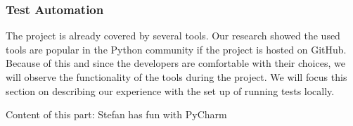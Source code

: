 \subsubsection{Test Automation}
The project is already covered by several tools. Our research showed the used tools are popular in the Python community if the project is hosted on GitHub. Because of this and since the developers are comfortable with their choices, we will observe the functionality of the tools during the project. We will focus this section on describing our experience with the set up of running tests locally.

Content of this part: Stefan has fun with PyCharm
